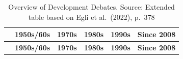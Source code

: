 \documentclass[
  a4paper,
  openany]{book}
\begin{document}
\begin{longtable}[]{@{}
  >{\raggedright\arraybackslash}p{}
  >{\raggedright\arraybackslash}p{}
  >{\raggedright\arraybackslash}p{}
  >{\raggedright\arraybackslash}p{}
  >{\raggedright\arraybackslash}p{}
  >{\raggedright\arraybackslash}p{}@{}}
\caption{Overview of Development Debates. Source: Extended table based
on Egli et al.~(2022),
p.~378}\label{tbl-development-debates}\tabularnewline
\toprule\noalign{}
\begin{minipage}[b]{\linewidth}\raggedright
\end{minipage} & \begin{minipage}[b]{\linewidth}\raggedright
\textbf{1950s/60s}
\end{minipage} & \begin{minipage}[b]{\linewidth}\raggedright
\textbf{1970s}
\end{minipage} & \begin{minipage}[b]{\linewidth}\raggedright
\textbf{1980s}
\end{minipage} & \begin{minipage}[b]{\linewidth}\raggedright
\textbf{1990s}
\end{minipage} & \begin{minipage}[b]{\linewidth}\raggedright
\textbf{Since 2008}
\end{minipage} \\
\midrule\noalign{}
\endfirsthead
\toprule\noalign{}
\begin{minipage}[b]{\linewidth}\raggedright
\end{minipage} & \begin{minipage}[b]{\linewidth}\raggedright
\textbf{1950s/60s}
\end{minipage} & \begin{minipage}[b]{\linewidth}\raggedright
\textbf{1970s}
\end{minipage} & \begin{minipage}[b]{\linewidth}\raggedright
\textbf{1980s}
\end{minipage} & \begin{minipage}[b]{\linewidth}\raggedright
\textbf{1990s}
\end{minipage} & \begin{minipage}[b]{\linewidth}\raggedright
\textbf{Since 2008}

\end{minipage}
\end{longtable}
\end{document}
